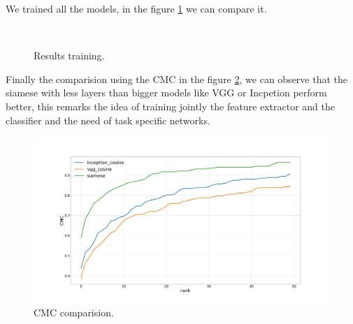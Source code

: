\documentclass[12pt, a4paper, titlepage,twoside,openright]{article}
\begin{document}
We trained all the models, in the figure \ref{lossesSiam} we can compare it.

\begin{figure}[H]
		
\centering

\\

\caption{Results training.}
\label{lossesSiam}
\end{figure}



Finally the comparision using the CMC in the figure \ref{siamesCOMP}, we can observe that the siamese with less layers than bigger models like VGG or Incpetion perform better, this remarks the idea of training jointly the feature extractor and the classifier and the need of task specific networks.

\begin{figure}[hptb]
\centering         
\includegraphics[width=15cm]{siameseDev/cmcPlots2.png}
\caption{CMC comparision.} \label{siamesCOMP}
\end{figure}
\end{document}
